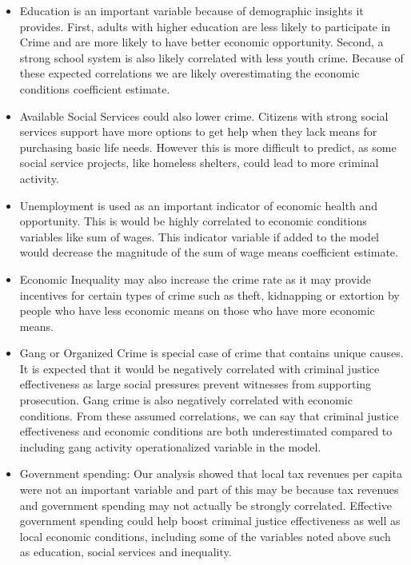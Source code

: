 \documentclass[]{article}
\providecommand{\tightlist}{%
  \setlength{\itemsep}{0pt}\setlength{\parskip}{0pt}}
\begin{document}
\begin{itemize}
\tightlist
\item
  Education is an important variable because of demographic insights it
  provides. First, adults with higher education are less likely to
  participate in Crime and are more likely to have better economic
  opportunity. Second, a strong school system is also likely correlated
  with less youth crime. Because of these expected correlations we are
  likely overestimating the economic conditions coefficient estimate.
\item
  Available Social Services could also lower crime. Citizens with strong
  social services support have more options to get help when they lack
  means for purchasing basic life needs. However this is more difficult
  to predict, as some social service projects, like homeless shelters,
  could lead to more criminal activity.
\item
  Unemployment is used as an important indicator of economic health and
  opportunity. This is would be highly correlated to economic conditions
  variables like sum of wages. This indicator variable if added to the
  model would decrease the magnitude of the sum of wage means
  coefficient estimate.
\item
  Economic Inequality may also increase the crime rate as it may provide
  incentives for certain types of crime such as theft, kidnapping or
  extortion by people who have less economic means on those who have
  more economic means.
\item
  Gang or Organized Crime is special case of crime that contains unique
  causes. It is expected that it would be negatively correlated with
  criminal justice effectiveness as large social pressures prevent
  witnesses from supporting prosecution. Gang crime is also negatively
  correlated with economic conditions. From these assumed correlations,
  we can say that criminal justice effectiveness and economic conditions
  are both underestimated compared to including gang activity
  operationalized variable in the model.\\
\item
  Government spending: Our analysis showed that local tax revenues per
  capita were not an important variable and part of this may be because
  tax revenues and government spending may not actually be strongly
  correlated. Effective government spending could help boost criminal
  justice effectiveness as well as local economic conditions, including
  some of the variables noted above such as education, social services
  and inequality.
\end{itemize}
\end{document}
